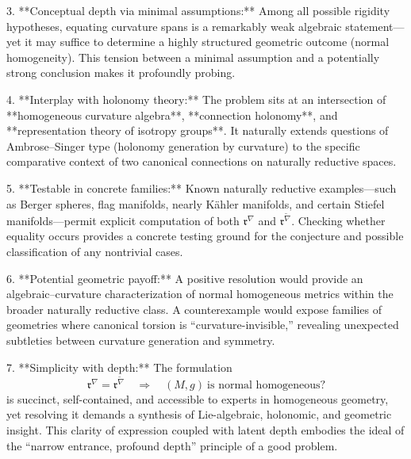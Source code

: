 3. **Conceptual depth via minimal assumptions:**  
   Among all possible rigidity hypotheses, equating curvature spans is a remarkably weak algebraic statement—yet it may suffice to determine a highly structured geometric outcome (normal homogeneity). This tension between a minimal assumption and a potentially strong conclusion makes it profoundly probing.

4. **Interplay with holonomy theory:**  
   The problem sits at an intersection of **homogeneous curvature algebra**, **connection holonomy**, and **representation theory of isotropy groups**. It naturally extends questions of Ambrose–Singer type (holonomy generation by curvature) to the specific comparative context of two canonical connections on naturally reductive spaces.

5. **Testable in concrete families:**  
   Known naturally reductive examples—such as Berger spheres, flag manifolds, nearly Kähler manifolds, and certain Stiefel manifolds—permit explicit computation of both \(\mathfrak{r}^{\nabla}\) and \(\mathfrak{r}^{\tilde{\nabla}}\). Checking whether equality occurs provides a concrete testing ground for the conjecture and possible classification of any nontrivial cases.

6. **Potential geometric payoff:**  
   A positive resolution would provide an algebraic–curvature characterization of normal homogeneous metrics within the broader naturally reductive class. A counterexample would expose families of geometries where canonical torsion is “curvature-invisible,” revealing unexpected subtleties between curvature generation and symmetry.

7. **Simplicity with depth:**  
   The formulation  
   \[
   \mathfrak{r}^{\nabla} = \mathfrak{r}^{\tilde{\nabla}} \quad \Rightarrow \quad (M,g)\ \text{is normal homogeneous?}
   \]
   is succinct, self-contained, and accessible to experts in homogeneous geometry, yet resolving it demands a synthesis of Lie-algebraic, holonomic, and geometric insight. This clarity of expression coupled with latent depth embodies the ideal of the “narrow entrance, profound depth” principle of a good problem.